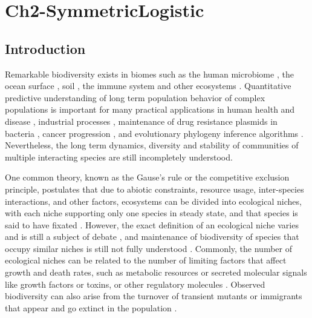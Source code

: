 \chapter{Ch2-SymmetricLogistic}



\section{Introduction}

Remarkable biodiversity exists in biomes such as the human microbiome \cite{Korem2015,Coburn2015,Palmer2001}, the ocean surface \cite{Hutchinson1961,Cordero2016}, soil \cite{Friedman2016}, the immune system \cite{Weinstein2009,Desponds2015,Stirk2010} and other ecosystems \cite{Tilman1996,Naeem2001}. 
Quantitative predictive understanding of long term population behavior of complex populations is important for many practical applications in human health and disease \cite{Coburn2015,Palmer2001,Kinross2011}, industrial processes \cite{Wolfe2014}, maintenance of drug resistance plasmids in bacteria \cite{Gooding-townsend2015}, cancer progression \cite{Ashcroft2015}, and evolutionary phylogeny inference algorithms \cite{Rice2004,Blythe2007}. 
Nevertheless, the long term dynamics, diversity and stability of communities of multiple interacting species are still incompletely understood.

One common theory, known as the Gause's rule or the competitive exclusion principle, postulates that due to abiotic constraints, resource usage, inter-species interactions, and other factors, ecosystems can be divided into ecological niches, with each niche supporting only one species in steady state, and that species is said to have fixated \cite{Hardin1960,Mayfield2010,Kimura1968,Nadell2013}. 
However, the exact definition of an ecological niche varies and is still a subject of debate \cite{Leibold1995,Hutchinson1961,Abrams1980,Chesson2000,Adler2010,Capitan2017,Fisher2014}, and maintenance of biodiversity of species that occupy similar niches is still not fully understood \cite{May1999,Pennisi2005,Posfai2017}. 
Commonly, the number of ecological niches can be related to the number of limiting factors that affect growth and death rates, such as metabolic resources or secreted molecular signals like growth factors or toxins, or other regulatory molecules \cite{Armstrong1976,McGehee1977a,Armstrong1980,Posfai2017}. 
Observed biodiversity can also arise from the turnover of transient mutants or immigrants that appear and go extinct in the population \cite{Hubbell2001,Desai2007,Carroll2015}.

